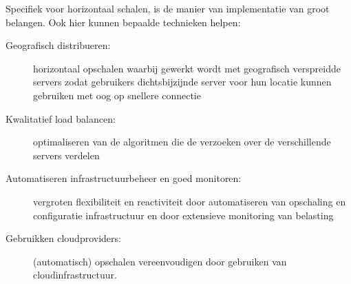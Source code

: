 Specifiek voor horizontaal schalen, is de manier van implementatie van groot
belangen. Ook hier kunnen bepaalde technieken helpen:

\begin{description}
    \item [Geografisch distribueren:] horizontaal opschalen
    waarbij gewerkt wordt met geografisch verspreidde servers
    zodat gebruikers dichtsbijzijnde server voor hun locatie kunnen gebruiken
    met oog op snellere connectie

    \item [Kwalitatief load balancen:] optimaliseren van de algoritmen die
    de verzoeken over de verschillende servers verdelen

    \item [Automatiseren infrastructuurbeheer en goed monitoren:] vergroten
    flexibiliteit en reactiviteit door automatiseren van opschaling en
    configuratie infrastructuur en door extensieve monitoring van belasting
    
    \item [Gebruikken cloudproviders:] (automatisch) opschalen vereenvoudigen
    door gebruiken van cloudinfrastructuur.
\end{description}


